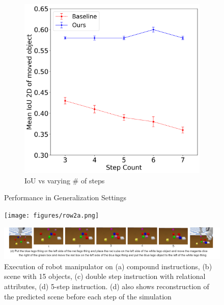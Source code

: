 \begin{figure}
\begin{subfigure}{0.5\hsize}
     \centering    
    \includegraphics[scale=0.19]{figures/multi-step.png}
    \caption{\footnotesize{IoU vs varying \# of steps}}
    \label{fig:large_steps}
\end{subfigure}
\caption{Performance in Generalization Settings}
\end{figure}

\begin{figure}[hbt!]
    \centering    
    \texttt{[image: figures/row2a.png]}
    \label{fig:qual-1}
\end{figure}

\begin{figure}[hbt!]
    \centering    
    \includegraphics[width=17cm]{figures/row2b.png}
    \caption{
    \footnotesize{
    Execution of robot manipulator on (a) compound instructions, (b) scene with 15 objects, (c) double step instruction with relational attributes, (d) 5-step instruction. (d) also shows reconstruction of the predicted scene before each step of the simulation
    }}
    \label{fig:qual-1}
\end{figure}


